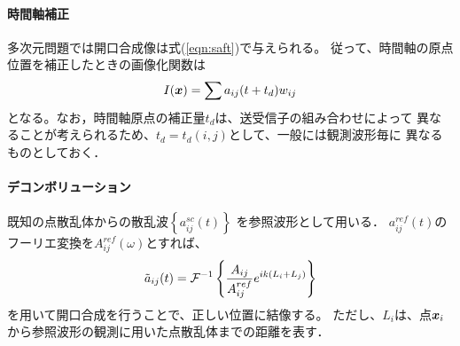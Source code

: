 \documentclass[10pt,a4j,dvipdfmx]{jarticle}
\begin{document}
\paragraph{時間軸補正}
多次元問題では開口合成像は式(\ref{eqn:saft})で与えられる。
従って、時間軸の原点位置を補正したときの画像化関数は
\begin{equation}
	I(\mbox{\boldmath $x$})=\sum a_{ij}(t+t_d)w_{ij}
	\label{eqn:}
\end{equation}
となる。なお，時間軸原点の補正量$t_d$は、送受信子の組み合わせによって
異なることが考えられるため、$t_d=t_d(i,j)$として、一般には観測波形毎に
異なるものとしておく．
\paragraph{デコンボリューション}
既知の点散乱体からの散乱波$\left\{ a_{ij}^{sc}(t)\right\}$
を参照波形として用いる．
$a_{ij}^{ref}(t)$のフーリエ変換を$A^{ref}_{ij}(\omega)$とすれば、
\begin{equation}
	\tilde a_{ij}(t) = {\cal F}^{-1} 
	\left\{
		\frac{A_{ij}}{A_{ij}^{ref}}e^{ik(L_i+L_j)}
	\right\}
	\label{eqn:}
\end{equation}
を用いて開口合成を行うことで、正しい位置に結像する。
ただし、$L_i$は、点$\mbox{\boldmath $x$}_i$から参照波形の観測に用いた点散乱体までの距離を表す．
\end{document}
